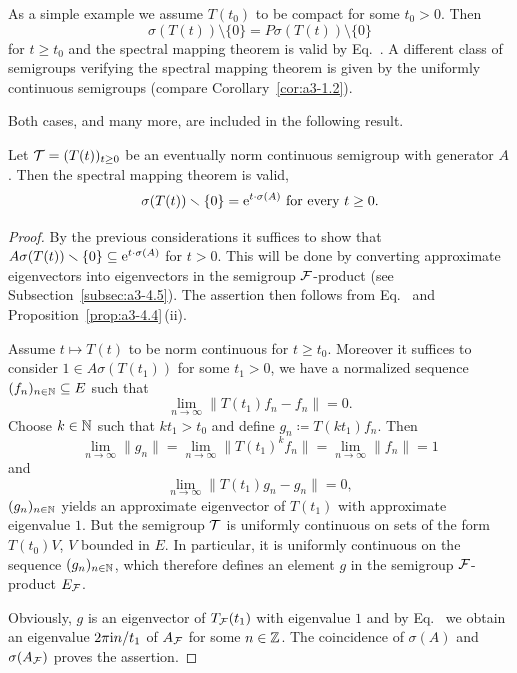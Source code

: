As a simple example we assume $T(t_{0})$ to be compact for some $t_{0} > 0$.
Then %
\[
	\sigma(T(t)) \setminus \{0\} = P\sigma(T(t)) \setminus \{0\}
\]
%
for $t \geq t_{0}$ and the spectral mapping theorem is valid by Eq.~.
A different class of semigroups verifying the spectral mapping theorem is given by the uniformly continuous semigroups (compare Corollary~\ref{cor:a3-1.2}).

Both cases, and many more, are included in the following result.
\begin{theorem}\label{thm:a3-6.6}%
Let $\TT = (T(t))_{t\geq 0}$ be an eventually norm continuous semigroup with generator $A$.
Then the spectral mapping theorem is valid, \ie 
\begin{equation}\label{eq:a3-6.6)}
	\sigma(T(t)) \setminus \{0\} = \eu^{t \cdot \sigma(A)} \text{ for every } t \geq 0 .
\end{equation}
\end{theorem}
\begin{proof}
By the previous considerations it suffices to show that $A\sigma(T(t)) \smallsetminus \{0\} \subseteq \mathrm{e}^{t \cdot \sigma(A)}$ for $t > 0$.
This will be done by converting approximate eigenvectors into eigenvectors in the semigroup $\mathcal{F}$-product (see Subsection~\ref{subsec:a3-4.5}).
The assertion then follows from Eq.~ and Proposition~\ref{prop:a3-4.4}\,(ii).

Assume $t \mapsto T(t)$ to be norm continuous for $t \geq t_{0}$.
Moreover it suffices to consider $1 \in A\sigma(T(t_{1}))$ for some $t_{1} > 0$, \ie we have a normalized sequence $(f_{n})_{n\in\mathbb{N}} \subseteq E$ such that
\[
\lim_{n\to\infty} \|T(t_{1})f_{n} - f_{n}\| = 0 .
\]
Choose $k \in \mathbb{N}$ such that $kt_{1} > t_{0}$ and define $g_{n} \coloneq T(kt_{1})f_{n}$.
Then
\[
\lim_{n\to\infty}\|g_{n}\| = \lim_{n\to\infty}\|T(t_{1})^{k}f_{n}\| = \lim_{n\to\infty}\|f_{n}\| = 1
\]
and
\[
\lim_{n\to\infty} \|T(t_{1})g_{n} - g_{n}\| = 0 ,
\]
\ie $(g_{n})_{n\in\mathbb{N}}$ yields an approximate eigenvector 
of\/ $T(t_{1})$ with approximate eigenvalue $1$.
But the semigroup $\mathcal{T}$ is uniformly continuous on sets of the form $T(t_{0})V$, $V$ bounded in $E$.
In particular, it is uniformly continuous on the sequence $(g_{n})_{n\in\mathbb{N}}$, which therefore defines an element $g$ in the semigroup $\mathcal{F}$-product $E_{\mathcal{F}}$.

Obviously, $g$ is an eigenvector of\/ $T_{\mathcal{F}}(t_{1})$ with eigenvalue $1$ and by Eq.~ we obtain an eigenvalue $2\pi\mathrm{i}  n/t_{1}$ of\/ $A_{\mathcal{F}}$ for some $n \in \mathbb{Z}$.
The coincidence of\/ $\sigma(A)$ and $\sigma(A_{\mathcal{F}})$ proves the assertion.
\end{proof}

